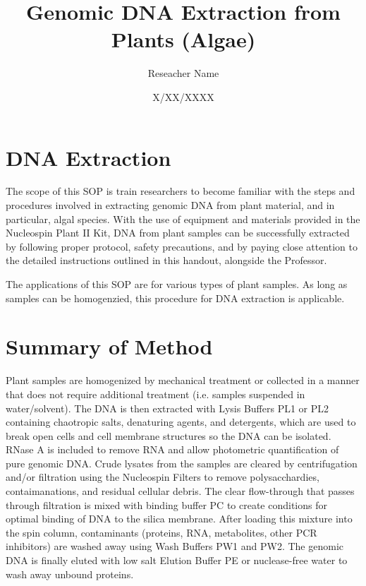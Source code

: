 \documentclass[12pt]{../SOP3_alpha}
\title{Genomic DNA Extraction from Plants (Algae)}
\date{X/XX/XXXX}
\author{Reseacher Name}
\begin{document}


\maketitle

\section{DNA Extraction }

\NP The scope of this SOP is train researchers to become familiar with the steps and procedures involved in extracting genomic DNA from plant material, and in particular, algal species. With the use of equipment and materials provided in the Nucleospin Plant II Kit, DNA from plant samples can be successfully extracted by following proper protocol, safety precautions, and by paying close attention to the detailed instructions outlined in this handout, alongside the Professor. 

\NP The applications of this SOP are for various types of plant samples. As long as samples can be homogenzied, this procedure for DNA extraction is applicable. 

\section{Summary of Method}

\NP Plant samples are homogenized by mechanical treatment or collected in a manner that does not require additional treatment (i.e. samples suspended in water/solvent). The DNA is then extracted with Lysis Buffers PL1 or PL2 containing chaotropic salts, denaturing agents, and detergents, which are used to break open cells and cell membrane structures so the DNA can be isolated. RNase A is included to remove RNA and allow photometric quantification of pure genomic DNA. Crude lysates from the samples are cleared by centrifugation and/or filtration using the Nucleospin Filters to remove polysacchardies, contaimanations, and residual cellular debris. The clear flow-through that passes through filtration is mixed with binding buffer PC to create conditions for optimal binding of DNA to the silica membrane. After loading this mixture into the spin column, contaminants (proteins, RNA, metabolites, other PCR inhibitors) are washed away using Wash Buffers PW1 and PW2. The genomic DNA is finally eluted with low salt Elution Buffer PE or nuclease-free water to wash away unbound proteins.
\end{document}
